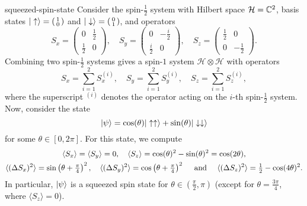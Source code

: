 \begin{example}{squeezed-spin-state}
    Consider the spin-$\tfrac{1}{2}$ system with Hilbert space $\mathcal{H} = \mathbb{C}^2$, basis states $|\uparrow\rangle = \left(\begin{smallmatrix} 1 \\ 0 \end{smallmatrix}\right)$ and $|\downarrow\rangle = \left(\begin{smallmatrix} 0 \\ 1 \end{smallmatrix}\right)$, and operators
    \[ S_x = \begin{pmatrix} 0 & \tfrac{1}{2} \\ \tfrac{1}{2} & 0 \end{pmatrix}, \quad S_y = \begin{pmatrix} 0 & - \tfrac{i}{2} \\ \tfrac{i}{2} & 0 \end{pmatrix}, \quad S_z = \begin{pmatrix} \tfrac{1}{2} & 0 \\ 0 & - \tfrac{1}{2} \end{pmatrix} . \]
    Combining two spin-$\tfrac{1}{2}$ systems gives a spin-$1$ system $\mathcal{H} \otimes \mathcal{H}$ with operators
    \[ S_x = \sum_{i = 1}^{2} S_x^{(i)}, \quad S_y = \sum_{i = 1}^{2} S_y^{(i)}, \quad S_z = \sum_{i = 1}^{2} S_z^{(i)} , \]
    where the superscript $^{(i)}$ denotes the operator acting on the $i$-th spin-$\tfrac{1}{2}$ system. Now, consider the state
    \[ |\psi\rangle = \cos(\theta) |\uparrow \uparrow\rangle + \sin(\theta) |\downarrow \downarrow\rangle \]
    for some $\theta \in [0, 2 \pi]$. For this state, we compute
    \[ \begin{gathered}
        \langle S_x \rangle = \langle S_y \rangle = 0, \quad \langle S_z \rangle = \cos(\theta)^2 - \sin(\theta)^2 = \cos(2 \theta) , \\
        \langle (\Delta S_x)^2 \rangle = \sin \left( \theta + \tfrac{\pi}{4} \right)^2, \quad \langle (\Delta S_y)^2 \rangle = \cos \left( \theta + \tfrac{\pi}{4} \right)^2 \quad \textup{ and } \quad \langle (\Delta S_z)^2 \rangle = \tfrac{1}{2} - \cos(4 \theta)^2 .
    \end{gathered} \]
    In particular, $|\psi\rangle$ is a squeezed spin state for $\theta \in \left(\tfrac{\pi}{2}, \pi\right)$ (except for $\theta = \tfrac{3 \pi}{4}$, where $\langle S_z \rangle = 0$).
\end{example}
